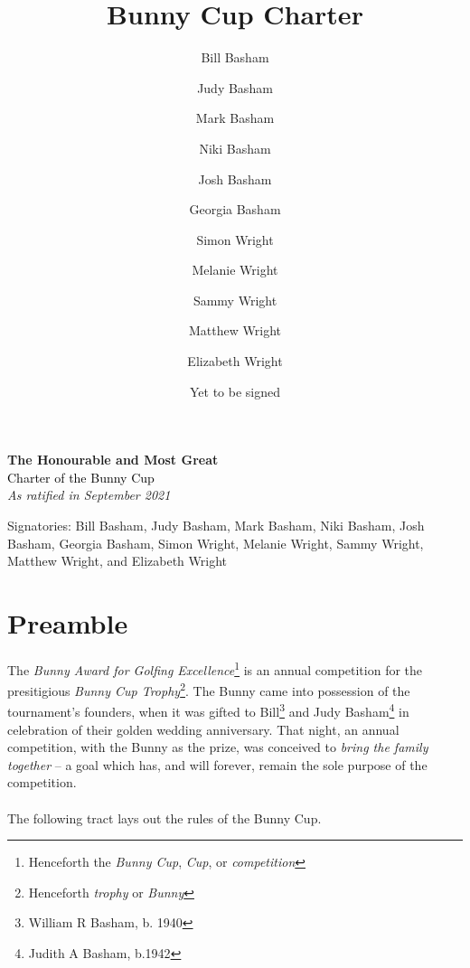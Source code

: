 \documentclass[a4paper]{article}
\title{Bunny Cup Charter}
\author{Bill Basham \and Judy Basham \and Mark Basham \and Niki Basham \and Josh Basham \and Georgia Basham \and Simon Wright \and Melanie Wright \and  Sammy Wright \and Matthew Wright \and Elizabeth Wright}
\date{Yet to be signed}
\begin{document}
\begin{titlepage} %

	\raggedleft %
	
	\vspace*{\baselineskip} %
	
	

	
	
	
	\textbf{\LARGE The Honourable and Most Great}\\[\baselineskip] %
	
	{\textcolor{Black}{\Huge Charter of the Bunny Cup}}\\[\baselineskip] %
	
	{\Large \textit{As ratified in September 2021}} %
	
	\vfill %
	
		{\Large Signatories: Bill Basham, Judy Basham,  Mark Basham,  Niki Basham,  Josh Basham, Georgia Basham, Simon Wright,  Melanie Wright,  Sammy Wright, Matthew Wright, and Elizabeth Wright} %
	
	\vspace*{3\baselineskip} %

\end{titlepage}

\section*{Preamble}

The \emph{Bunny Award for Golfing Excellence}\footnote{Henceforth the \emph{Bunny Cup}, \emph{Cup}, or \emph{competition}} is an annual competition for the presitigious \emph{Bunny Cup Trophy}\footnote{Henceforth \emph{trophy} or \emph{Bunny}}. The Bunny came into possession of the tournament's founders, when it was gifted to Bill\footnote{William R Basham, b. 1940} and Judy Basham\footnote{Judith A Basham, b.1942} in celebration of their golden wedding anniversary. That night, an annual competition, with the Bunny as the prize, was conceived to \emph{bring the family together} – a goal which has, and will forever, remain the sole purpose of the competition.
\\
\\
The following tract lays out the rules of the Bunny Cup.
\end{document}
